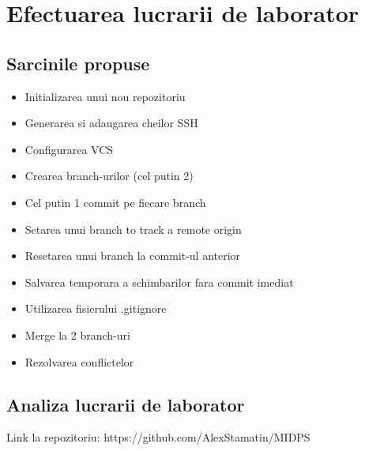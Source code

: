 \section{Efectuarea lucrarii de laborator}

\subsection{Sarcinile propuse}
\begin{itemize}
	\item Initializarea unui nou repozitoriu
	\item Generarea si adaugarea cheilor SSH
	\item Configurarea VCS 
	\item Crearea branch-urilor (cel putin 2)
	\item Cel putin 1 commit pe fiecare branch
	\item Setarea unui branch to track a remote origin
	\item Resetarea unui branch la commit-ul anterior
	\item Salvarea temporara a schimbarilor fara commit imediat
	\item Utilizarea fisierului .gitignore
	\item Merge la 2 branch-uri
	\item Rezolvarea conflictelor
\end{itemize}


\subsection{Analiza lucrarii de laborator}

Link la repozitoriu: https://github.com/AlexStamatin/MIDPS

